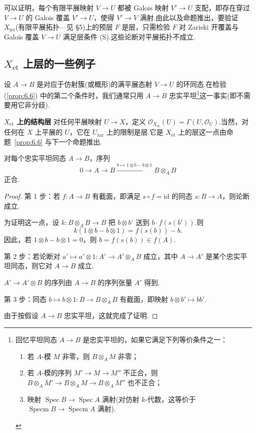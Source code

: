 \begin{remark}\label{rem:6.7}
可以证明，每个有限平展映射 $V \to U$ 都被 Galois 映射 $V' \to U$ 支配，即存在穿过 $V \to U$ 的 Galois 覆盖 $V' \to U$，使得 $V' \to V$ 满射.由此以及命题推出，要验证 $X_{\mathrm{fet}}$(有限平展拓扑---见 \S 5)上的预层 $F$ 是层，只需检验 $F$ 对 Zariski 开覆盖与 Galois 覆盖 $V \to U$ 满足层条件 (S).这些论断对平展拓扑不成立.
\end{remark}

\subsection*{\texorpdfstring{$X_{\mathrm{et}}$ 上层的一些例子}{X\_et 上层的一些例子}}

设 $A \to B$ 是对应于仿射簇(或概形)的满平展态射 $V \to U$ 的环同态.在检验 (\ref{prop:6.6}) 中的第二个条件时，我们通常只用 $A \to B$ 忠实平坦\footnote{回忆平坦同态 $A \to B$ 是忠实平坦的，如果它满足下列等价条件之一：
\begin{enumerate}
  \item 若 $A$-模 $M$ 非零，则 $B \otimes_{A} M$ 非零；
  \item 若 $A$-模的序列 $M' \to M \to M''$ 不正合，则 $B \otimes_{A} M' \to B \otimes_{A} M \to B \otimes_{A} M''$ 也不正合；
  \item 映射 $\operatorname{Spec} B \to \operatorname{Spec} A$ 满射(对仿射 $k$-代数，这等价于 $\operatorname{Specm} B \to \operatorname{Specm} A$ 满射).
\end{enumerate}}这一事实(即不需要用它非分歧).

\textbf{$X_{\mathrm{et}}$ 上的结构层} 对任何平展映射 $U \to X$，定义 $\mathcal{O}_{X_{\mathrm{et}}}(U) = \Gamma(U, \mathcal{O}_U)$.当然，对任何在 $X$ 上平展的 $U$，它在 $U_{\mathrm{zar}}$ 上的限制是层.它是 $X_{\mathrm{et}}$ 上的层这一点由命题~\ref{prop:6.6} 与下一个命题推出.

\begin{proposition}\label{prop:6.8}
对每个忠实平坦同态 $A \to B$，序列
\[
0 \to A \to B \xrightarrow{b \mapsto 1 \otimes b - b \otimes 1} B \otimes_{A} B
\]
正合.
\end{proposition}

\begin{proof}
第 1 步：若 $f \colon A \to B$ 有截面，即满足 $s \circ f = \mathrm{id}$ 的同态 $s \colon B \to A$，则论断成立.

为证明这一点，设 $k \colon B \otimes_{A} B \to B$ 把 $b \otimes b'$ 送到 $b \cdot f(s(b'))$.则
\[
k(1 \otimes b - b \otimes 1) = f(s(b)) - b.
\]
因此，若 $1 \otimes b - b \otimes 1 = 0$，则 $b = f(s(b)) \in f(A)$.

第 2 步：若论断对 $a' \mapsto a' \otimes 1 \colon A' \to A' \otimes_{A} B$ 成立，其中 $A \to A'$ 是某个忠实平坦同态，则它对 $A \to B$ 成立.

$A' \to A' \otimes B$ 的序列由 $A \to B$ 的序列张量 $A'$ 得到.

第 3 步：同态 $b \mapsto b \otimes 1 \colon B \to B \otimes_{A} B$ 有截面，即映射 $b \otimes b' \mapsto bb'$.

由于按假设 $A \to B$ 忠实平坦，这就完成了证明.
\end{proof}

